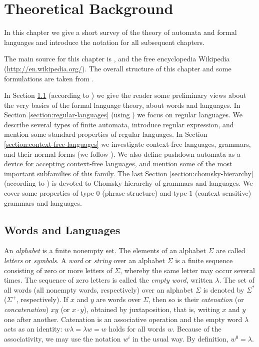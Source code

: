 \chapter{Theoretical Background}
\label{chapter:background}

In this chapter we give a short survey of the theory of automata and formal languages and introduce the notation for all subsequent chapters.

The main source for this chapter is \citep{RozSal97I, HopcroftMotwaniUllman07}, and the free encyclopedia Wikipedia (\url{http://en.wikipedia.org/}). The overall structure of this chapter and some formulations are taken from \citep{C10Diploma}.

In Section \ref{section:words-and-languages} (according to \citep{MaSa1997formal}) we give the reader some preliminary views about the very basics of the formal language theory, about words and languages. In Section \ref{section:regular-languages} (using \citep{Sh1997regular}) we focus on regular languages. We describe several types of finite automata, introduce regular expression, and mention some standard properties of regular languages. In Section \ref{section:context-free-languages} we investigate context-free languages, grammars, and their normal forms (we follow \citep{AuBeBo1997context-free}). We also define pushdown automata as a device for accepting context-free languages, and mention some of the most important subfamilies of this family. The last Section \ref{section:chomsky-hierarchy} (according to \citep{MaSa1997aspects}) is devoted to Chomsky hierarchy of grammars and languages. We cover some properties  of type $0$ (phrase-structure) and type $1$ (context-sensitive) grammars and languages.

\section{Words and Languages}
\label{section:words-and-languages}

An \emph{alphabet} is a finite nonempty set. The elements of an alphabet $\Sigma$ are called \emph{letters} or \emph{symbols}. A \emph{word} or \emph{string} over an alphabet $\Sigma$ is a finite sequence consisting of zero or more letters of $\Sigma$, whereby the same letter may occur several times. The sequence of zero letters is called the  \emph{empty word}, written $\lambda$. The set of all words (all nonempty words, respectively) over an alphabet $\Sigma$ is denoted by $\Sigma^*$ ($\Sigma^+$, respectively). If $x$ and $y$ are words over $\Sigma$, then so is their \emph{catenation} (or \emph{concatenation}) $xy$ (or $x \cdot y$), obtained by juxtaposition, that is, writing $x$ and $y$ one after another. Catenation is an associative operation and the empty word $\lambda$ acts as an identity: $w \lambda = \lambda w = w$ holds for all words $w$. Because of the associativity, we may use the notation $w^i$ in the usual way. By definition, $w^0 = \lambda$.

